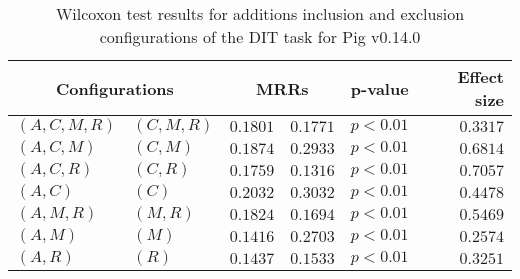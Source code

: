 
\begin{table}
\begin{spacing}{1.2}
\centering
\caption{Wilcoxon test results for additions inclusion and exclusion configurations of the DIT task for Pig v0.14.0}
\label{table:versus-wilcox-pig-dit-additions}
\begin{tabular}{ll|rr|rr}
\toprule
      \multicolumn{2}{c|}{Configurations} &          \multicolumn{2}{c|}{MRRs} &       p-value & Effect size \\
\midrule
 $(A,C,M,R)$ &  $(C,M,R)$ & $0.1801$ & $0.1771$ & $p<0.01$ &    $0.3317$ \\
   $(A,C,M)$ &    $(C,M)$ & $0.1874$ & $0.2933$ & $p<0.01$ &    $0.6814$ \\
   $(A,C,R)$ &    $(C,R)$ & $0.1759$ & $0.1316$ & $p<0.01$ &    $0.7057$ \\
     $(A,C)$ &      $(C)$ & $0.2032$ & $0.3032$ & $p<0.01$ &    $0.4478$ \\
   $(A,M,R)$ &    $(M,R)$ & $0.1824$ & $0.1694$ & $p<0.01$ &    $0.5469$ \\
     $(A,M)$ &      $(M)$ & $0.1416$ & $0.2703$ & $p<0.01$ &    $0.2574$ \\
     $(A,R)$ &      $(R)$ & $0.1437$ & $0.1533$ & $p<0.01$ &    $0.3251$ \\
\bottomrule
\end{tabular}

\end{spacing}
\end{table}

